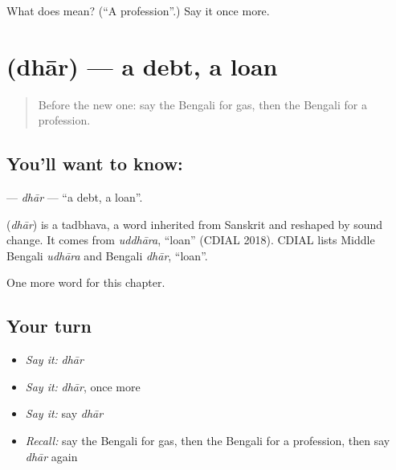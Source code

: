 \begin{tcolorbox}[breakable,colback=teal!4,colframe=teal!35!black,title={Before you move on}]
What does  mean? (\textquotedblleft{}A profession\textquotedblright{}.) Say it once more.
\end{tcolorbox}
\section[\texorpdfstring{\bn{ধার} (dhār)}{ধার (dhār)}]{ (dhār) — a debt, a loan}

\label{lesson:BN-C176-dhar}



\begin{quote}
Before the new one: say the Bengali for gas, then the Bengali for a profession.
\end{quote}

\subsection*{You'll want to know: }
\textbf{} — \emph{dhār} — \textquotedblleft{}a debt, a loan\textquotedblright{}.

\begin{cousinweb}
\textbf{} (\emph{dhār}) is a tadbhava, a word inherited from Sanskrit and reshaped by sound change. It comes from \emph{uddhāra}, \textquotedblleft{}loan\textquotedblright{} (CDIAL 2018). CDIAL lists Middle Bengali \emph{udhāra} and Bengali \emph{dhār}, \textquotedblleft{}loan\textquotedblright{}.
\end{cousinweb}

\begin{grammarlens}[title={What you've built}]
One more word for this chapter.
\end{grammarlens}

\subsection*{Your turn}
\begin{itemize}
\raggedright
  \item \emph{Say it:} \emph{dhār}
  \item \emph{Say it:} \emph{dhār}, once more
  \item \emph{Say it:} say \emph{dhār}
  \item \emph{Recall:} say the Bengali for gas, then the Bengali for a profession, then say \emph{dhār} again
\end{itemize}

